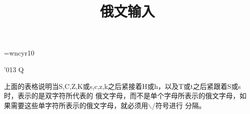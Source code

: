 \documentclass[11pt,openany]{article}
\begin{document}
\begin{CJK*}{GBK}{song}
\hoffset-1.5cm\voffset-2.5cm
\title{\bf 俄文输入}

\font\fontWCA=wncyr10
{\fontWCA
\begin{center}
    \char'013
Q

\end{center}}

上面的表格说明当S,C,Z,K或s,c,z,k之后紧接着H或h，以及T或t之后紧跟着S或s时，表示的是双字符所代表的
俄文字母，而不是单个字母所表示的俄文字母，如果需要这些单字符所表示的俄文字母，就必须用$\backslash$/符号进行
分隔。


\newpage
\end{CJK*}
\end{document}

